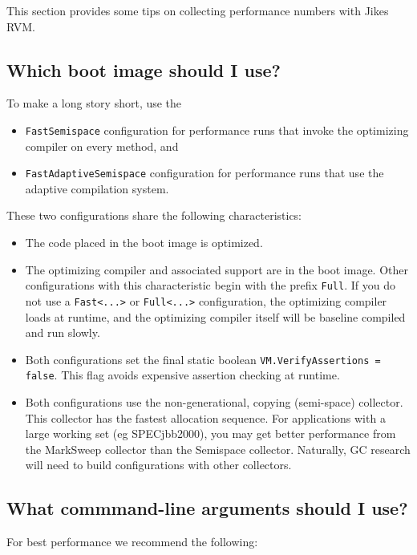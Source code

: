 This section provides some tips on collecting performance numbers with
Jikes RVM.

\subsection{Which boot image should I use?}

To make a long story short, use the
\begin{itemize}
\item {\tt FastSemispace} configuration for performance runs that invoke the optimizing compiler on every method, and
\item {\tt FastAdaptiveSemispace} configuration for performance runs that use the adaptive compilation system.
\end{itemize}

These two configurations share the following characteristics:

\begin{itemize}
\item The code placed in the boot image is optimized.
\item The optimizing compiler and associated support are in
the boot image.  Other
configurations with this characteristic begin with the prefix {\tt Full}.
If you do not use a {\tt Fast<...>} or {\tt Full<...>} configuration, 
the optimizing
compiler loads at runtime, and the optimizing compiler itself will be
baseline compiled and run slowly.
\item Both configurations set the final static boolean
{\tt VM.VerifyAssertions = false}.  This flag avoids expensive assertion
checking at runtime.
\item Both configurations use the non-generational, copying (semi-space) 
collector.  This collector has the fastest allocation sequence.  For
applications with a large working set (eg SPECjbb2000), you may get
better performance from the MarkSweep collector than the Semispace
collector.  Naturally, GC research will need to build configurations
with other collectors.
\end{itemize}

\subsection{What commmand-line arguments should I use?}

For best performance we recommend the following:

